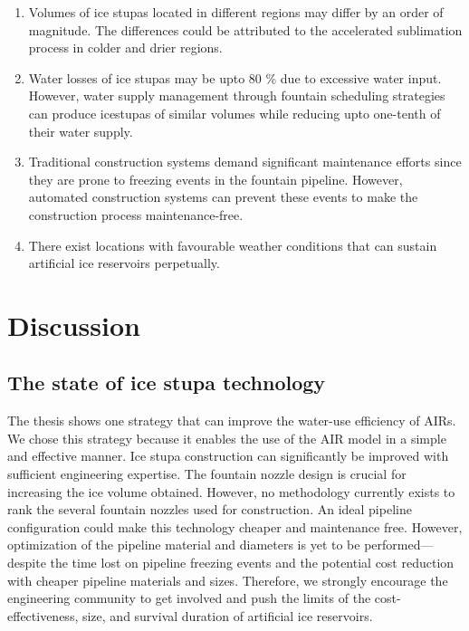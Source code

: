 \begin{enumerate} 

\item Volumes of ice stupas located in different regions may differ by an order of magnitude. The differences
  could be attributed to the accelerated sublimation process in colder and drier regions.

\item Water losses of ice stupas may be upto 80 \% due to excessive water input. However, water supply
  management through fountain scheduling strategies can produce icestupas of similar volumes while reducing upto
  one-tenth of their water supply.

\item Traditional construction systems demand significant maintenance efforts since they are prone to freezing
  events in the fountain pipeline. However, automated construction systems can prevent these events to make the
  construction process maintenance-free.

\item There exist locations with favourable weather conditions that can sustain artificial ice reservoirs
  perpetually.

\end{enumerate}

\section{Discussion}

\subsection{The state of ice stupa technology}

The thesis shows one strategy that can improve the water-use efficiency of AIRs. We chose this strategy
because it enables the use of the AIR model in a simple and effective manner. Ice stupa construction can
significantly be improved with sufficient engineering expertise. The fountain nozzle design is crucial for
increasing the ice volume obtained. However, no methodology currently exists to rank the several fountain
nozzles used for construction. An ideal pipeline configuration could make this technology cheaper and
maintenance free. However, optimization of the pipeline material and diameters is yet to be performed---despite
the time lost on pipeline freezing events and the potential cost reduction with cheaper pipeline materials and
sizes. Therefore, we strongly encourage the engineering community to get involved and push the limits of the
cost-effectiveness, size, and survival duration of artificial ice reservoirs. 

